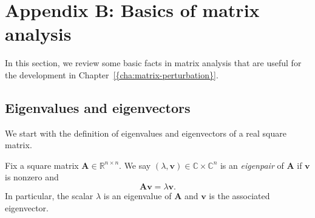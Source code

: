 \section{Appendix B: Basics of matrix analysis} \label{subsec:Matrix-analysis}

In this section, we review some basic facts in matrix analysis that are useful for the development in Chapter~\ref{{cha:matrix-perturbation}}. 
 

\subsection{Eigenvalues and eigenvectors}

We start with the definition of eigenvalues and eigenvectors of a real
square matrix.

\begin{definition}[Eigenpair]\label{def:eigenpair} Fix a square
matrix $\bm{A}\in\mathbb{R}^{n\times n}$. We say $(\lambda,\bm{v})\in\mathbb{C}\times\mathbb{C}^{n}$
is an \emph{eigenpair} of $\bm{A}$ if $\bm{v}$ is nonzero and 
\begin{equation}
\bm{A}\bm{v}=\lambda\bm{v}.\label{eq:def-eigenpair}
\end{equation}
In particular, the scalar $\lambda$ is an eigenvalue of $\bm{A}$
and $\bm{v}$ is the associated eigenvector. \end{definition}

